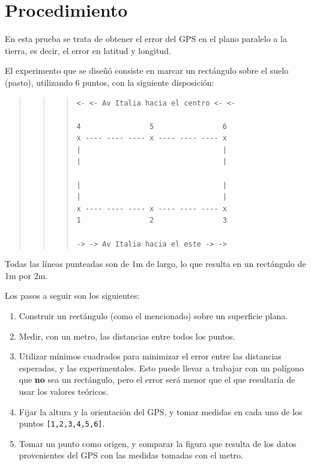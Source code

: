 \documentclass[spanish,12pt,a4paper,titlepage]{report}
\begin{document}
\newpage
\section{Procedimiento}

En esta prueba se trata de obtener el error del GPS en el plano paralelo a la tierra, es decir, el error en latitud y longitud.

El experimento que se diseñó consiste en marcar un rectángulo sobre el suelo (pasto), utilizando 6 puntos, con la siguiente disposición:

\begin{quote}
\begin{quote}
\begin{quote}
\begin{verbatim}
<- <- Av Italia hacia el centro <- <-

4                5                6
x ---- ---- ---- x ---- ---- ---- x
|                                 |
|                                 |

|                                 |
|                                 |
x ---- ---- ---- x ---- ---- ---- x
1                2                3

-> -> Av Italia hacia el este -> ->
\end{verbatim}
\end{quote}
\end{quote}
\end{quote}

Todas las líneas punteadas son de 1m de largo, lo que resulta en un rectángulo de 1m por 2m.

Los pasos a seguir son los siguientes:

\begin{enumerate}
\item Construir un rectángulo (como el mencionado) sobre un superficie plana.
\item Medir, con un metro, las distancias entre todos los puntos.
\item Utilizar mínimos cuadrados para minimizar el error entre las distancias esperadas, y las experimentales. Esto puede llevar a trabajar con un polígono que \textbf{no} sea un rectángulo, pero el error será menor que el que resultaría de usar los valores teóricos.
\item Fijar la altura y la orientación del GPS, y tomar medidas en cada uno de los puntos \verb+[1,2,3,4,5,6]+.
\item Tomar un punto como origen, y comparar la figura que resulta de los datos provenientes del GPS con las medidas tomadas con el metro.
\end{enumerate}
\end{document}
